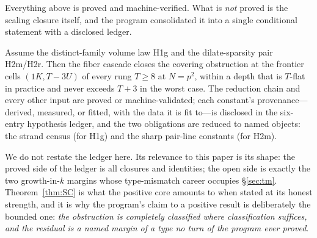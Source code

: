Everything above is proved and machine-verified. What is \emph{not}
proved is the scaling closure itself, and the program consolidated it
into a single conditional statement with a disclosed ledger.

\begin{theorem}\label{thm:SC}
Assume the distinct-family volume law H1g and the dilate-sparsity pair
H2m/H2r. Then the fiber cascade closes the covering obstruction at the
frontier cells $(1K,T{-}3U)$ of every rung $T\ge8$ at $N=p^2$, within a
depth that is $T$-flat in practice and never exceeds $T+3$ in the worst
case. The reduction chain and every other input are proved or
machine-validated; each constant's provenance---derived, measured, or
fitted, with the data it is fit to---is disclosed in the six-entry
hypothesis ledger, and the two obligations are reduced to named objects:
the strand census (for H1g) and the sharp pair-line constants (for
H2m).
\end{theorem}

We do not restate the ledger here. Its relevance to this paper is its
shape: the proved side of the ledger is all closures and identities; the
open side is exactly the two growth-in-$k$ margins whose type-mismatch
career occupies \S\ref{sec:tm}. Theorem~\ref{thm:SC} is what the positive
core amounts to when stated at its honest strength, and it is why the
program's claim to a positive result is deliberately the bounded one:
\emph{the obstruction is completely classified where classification
suffices, and the residual is a named margin of a type no turn of the
program ever proved}.
